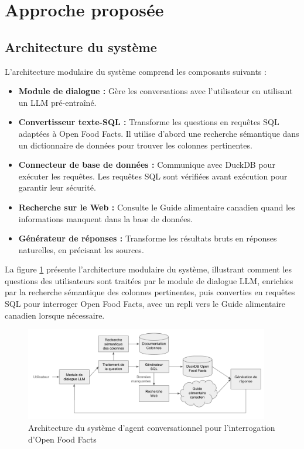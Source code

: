 \documentclass[a4paper,11pt]{article}
\begin{document}
\section{Approche proposée}
\label{sec:approche}

\subsection{Architecture du système}

L'architecture modulaire du système comprend les composants suivants :

\begin{itemize}
    \item \textbf{Module de dialogue :} Gère les conversations avec l'utilisateur en utilisant un LLM pré-entraîné.
    \item \textbf{Convertisseur texte-SQL :} Transforme les questions en requêtes SQL adaptées à 
    Open Food Facts. Il utilise d'abord une recherche sémantique dans un dictionnaire de données pour trouver les colonnes pertinentes.
    \item \textbf{Connecteur de base de données :} Communique avec DuckDB pour exécuter les requêtes. Les requêtes SQL sont vérifiées avant exécution pour garantir leur sécurité.
    \item \textbf{Recherche sur le Web :} Consulte le Guide alimentaire canadien quand les informations manquent dans la base de données.
    \item \textbf{Générateur de réponses :} Transforme les résultats bruts en réponses naturelles, en précisant les sources.
\end{itemize}

La figure \ref{fig:architecture} présente l'architecture modulaire du système, illustrant comment les questions des utilisateurs sont traitées par le module de dialogue LLM, enrichies par la recherche sémantique des colonnes pertinentes, puis converties en requêtes SQL pour interroger Open Food Facts, avec un repli vers le Guide alimentaire canadien lorsque nécessaire.

\begin{figure}[H]
    \centering
    \includegraphics[width=0.95\textwidth]{figures/architecture-agent.png}
    \caption{Architecture du système d'agent conversationnel pour l'interrogation d'Open Food Facts}
    \label{fig:architecture}
\end{figure}
\end{document}
